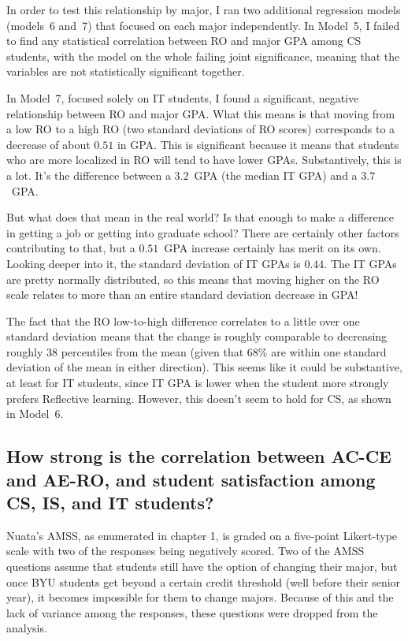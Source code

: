 In order to test this relationship by major, I ran two additional regression models (models~6 and~7) that focused on each major independently. In Model~5, I failed to find any statistical correlation between RO and major GPA among CS students, with the model on the whole failing joint significance, meaning that the variables are not statistically significant together.

In Model~7, focused solely on IT students, I found a significant, negative relationship between RO and major GPA. What this means is that moving from a low RO to a high RO (two standard deviations of RO scores) corresponds to a decrease of about $0.51$ in GPA. This is significant because it means that students who are more localized in RO will tend to have lower GPAs. Substantively, this is a lot. It's the difference between a $3.2$~GPA (the median IT GPA) and a $3.7$~GPA.

But what does that mean in the real world? Is that enough to make a difference in getting a job or getting into graduate school? There are certainly other factors contributing to that, but a $0.51$~GPA increase certainly has merit on its own. Looking deeper into it, the standard deviation of IT GPAs is $0.44$. The IT GPAs are pretty normally distributed, so this means that moving higher on the RO scale relates to more than an entire standard deviation decrease in GPA!

The fact that the RO low-to-high difference correlates to a little over one standard deviation means that the change is roughly comparable to decreasing roughly 38 percentiles from the mean (given that 68\% are within one standard deviation of the mean in either direction). This seems like it could be substantive, at least for IT students, since IT GPA is lower when the student more strongly prefers Reflective learning. However, this doesn't seem to hold for CS, as shown in Model~6.

\subsection{How strong is the correlation between AC-CE and AE-RO, and student satisfaction among CS, IS, and IT students?}
Nuata's AMSS, as enumerated in chapter 1, is graded on a five-point Likert-type scale with two of the responses being negatively scored. Two of the AMSS questions assume that students still have the option of changing their major, but once BYU students get beyond a certain credit threshold (well before their senior year), it becomes impossible for them to change majors. Because of this and the lack of variance among the responses, these questions were dropped from the analysis.

